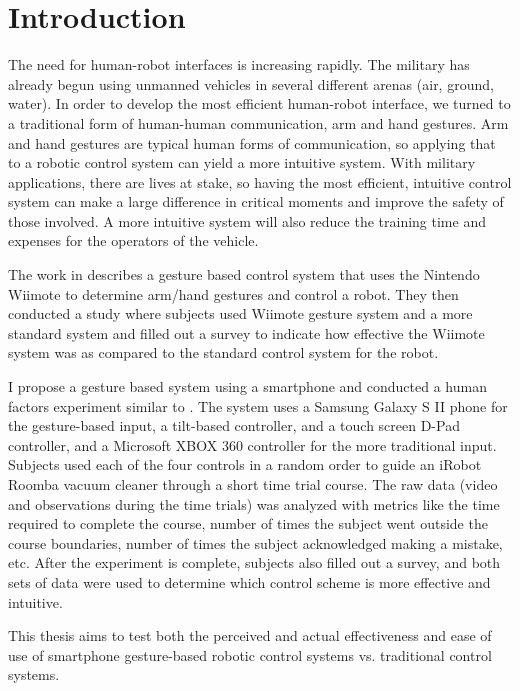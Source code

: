 \documentclass[12pt,a4paper]{report}
\begin{document}
\chapter{Introduction}
\pagestyle{headings}
\setcounter{page}{1}

The need for human-robot interfaces is increasing rapidly. The military has already begun using unmanned vehicles in several different arenas (air, ground, water). In order to develop the most efficient human-robot interface, we turned to a traditional form of human-human communication, arm and hand gestures. Arm and hand gestures are typical human forms of communication, so applying that to a robotic control system can yield a more intuitive system. With military applications, there are lives at stake, so having the most efficient, intuitive control system can make a large difference in critical moments and improve the safety of those involved. A more intuitive system will also reduce the training time and expenses for the operators of the vehicle.

The work in \cite{Varcholik_Barber_Nicholson_2008} describes a gesture based control system that uses the Nintendo Wiimote to determine arm/hand gestures and control a robot. They then conducted a study where subjects used Wiimote gesture system and a more standard system and filled out a survey to indicate how effective the Wiimote system was as compared to the standard control system for the robot.

I propose a gesture based system using a smartphone and conducted a human factors experiment similar to \cite{Varcholik_Barber_Nicholson_2008}. The system uses a Samsung Galaxy S II phone for the gesture-based input, a tilt-based controller, and a touch screen D-Pad controller, and a Microsoft XBOX 360 controller for the more traditional input. Subjects used each of the four controls in a random order to guide an iRobot Roomba vacuum cleaner through a short time trial course. The raw data (video and observations during the time trials) was analyzed with metrics like the time required to complete the course, number of times the subject went outside the course boundaries, number of times the subject acknowledged making a mistake, etc. After the experiment is complete, subjects also filled out a survey, and both sets of data were used to determine which control scheme is more effective and intuitive. 

This thesis aims to test both the perceived and actual effectiveness and ease of use of smartphone gesture-based robotic control systems vs. traditional control systems.
\end{document}
